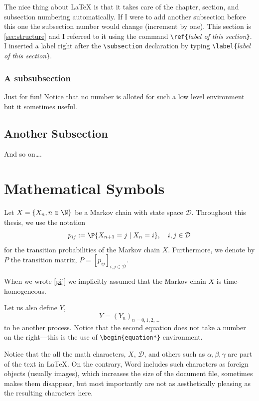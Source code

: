 The nice thing about \LaTeX{} is that it takes care of the chapter,
section, and subsection numbering automatically. If I were to add
another subsection before this one the subsection number would
change (increment by one). This section is \ref{sec:structure} and I
referred to it using the command \verb|\ref{|\emph{label of this
section}\verb|}|. I inserted a label right after the
\verb|\subsection| declaration by typing \verb|\label{|\emph{label
of this section}\verb|}|.

\subsubsection{A subsubsection}\label{subsub} Just for fun! Notice
that no number is alloted for such a low level environment but it
sometimes useful.

\subsection{Another Subsection}
And so on\ldots.

\section{Mathematical Symbols}
Let $X=\{X_n, n\in \N\}$ be a Markov chain with state space
$\mathcal{D}$. Throughout this thesis, we use the notation
\begin{equation}
p_{ij} := \P\{X_{n+1} = j \mid X_n = i\}, \quad i,j \in \mathcal{D}
\label{pij}
\end{equation}
for the transition probabilities of the Markov chain $X$.
Furthermore, we denote by $P$ the transition matrix, $P =
[p_{ij}]_{i,j\in\mathcal{D}}$.

When we wrote \eqref{pij} we implicitly assumed that the Markov
chain $X$ is time-homogeneous.

Let us also define $Y$,
\begin{equation*}
Y = (Y_n)_{n = 0,1,2,\ldots}
\end{equation*}
to be another process. Notice that the second equation does not take
a number on the right---this is the use of \verb|\begin{equation*}|
environment.

Notice that the all the math characters, $X$, $\mathcal{D}$, and
others such as $\alpha, \beta, \gamma$ are part of the text in
\LaTeX{}. On the contrary, Word includes such characters as foreign
objects (usually images), which increases the size of the document
file, sometimes makes them disappear, but most importantly are not
as aesthetically pleasing as the resulting characters here.


